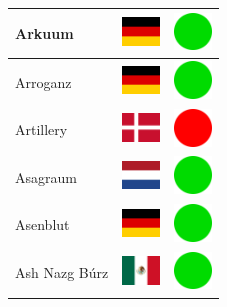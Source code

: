 \documentclass[12pt, a4paper, twoside]{report}
\begin{document}
\begin{center}
\begin{longtable}{|p{5cm}|p{2cm}|p{2cm}|}
Arkuum & \includegraphics[width=1cm]{4x3/de} & \includegraphics[width=1cm]{likes/y} \\ \hline
Arroganz & \includegraphics[width=1cm]{4x3/de} & \includegraphics[width=1cm]{likes/y} \\ \hline
Artillery & \includegraphics[width=1cm]{4x3/dk} & \includegraphics[width=1cm]{likes/n} \\ \hline
Asagraum & \includegraphics[width=1cm]{4x3/nl} & \includegraphics[width=1cm]{likes/y} \\ \hline
Asenblut & \includegraphics[width=1cm]{4x3/de} & \includegraphics[width=1cm]{likes/y} \\ \hline
Ash Nazg Búrz & \includegraphics[width=1cm]{4x3/mx} & \includegraphics[width=1cm]{likes/y} \\ \hline

\end{longtable}
\end{center}
\end{document}

